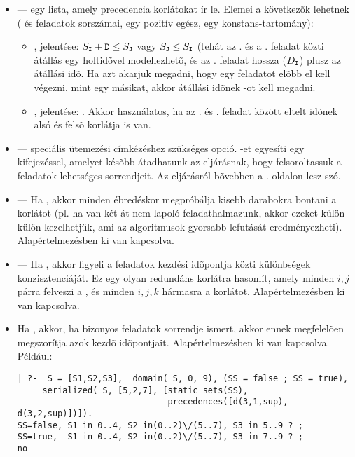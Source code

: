 \begin{itemize}
\item {} ---
           egy lista, amely precedencia korlátokat ír le. Elemei a következõk
          lehetnek ( és  feladatok sorszámai,  egy pozitív
          egész,  egy  konstans-tartomány):  
\begin{itemize}
\item{}, jelentése: $S_{\texttt{I}}+\texttt{D} \leq S_{\texttt{J}}$ vagy $S_{\texttt{J}} \leq S_{\texttt{I}}$
(tehát az . és a . feladat közti átállás egy holtidõvel modellezhetõ, és
 az . feladat hossza ($D_{\texttt{I}}$) plusz az átállási idõ. Ha azt akarjuk
megadni, hogy egy feladatot elõbb el kell végezni, mint egy másikat, akkor átállási
idõnek -ot kell megadni.
\item{}, jelentése: . Akkor használatos, ha az . és . feladat között
eltelt idõnek alsó és felsõ korlátja is van.
\end{itemize}

\item {} --- speciális ütemezési címkézéshez szükséges opció. -et
          egyesíti egy kifejezéssel, amelyet késõbb átadhatunk az 
          eljárásnak, hogy felsoroltassuk a feladatok lehetséges sorrendjeit. Az
           eljárásról bõvebben a \pageref{order_resource}. oldalon
          lesz szó.

\item {} ---
          Ha  , akkor minden ébredéskor megpróbálja
          kisebb darabokra bontani a korlátot (pl. ha van két
          át nem lapoló feladathalmazunk, akkor ezeket külön-külön
          kezelhetjük, ami az algoritmusok gyorsabb lefutását
          eredményezheti). Alapértelmezésben ki van kapcsolva.

\item {} ---
          Ha  , akkor figyeli a feladatok kezdési
          idõpontja közti különbségek konzisztenciáját. Ez egy olyan redundáns
          korlátra hasonlít, amely minden $i,j$ párra felveszi a
          , és minden $i,j,k$ hármasra a
           korlátot. Alapértelmezésben
          ki van kapcsolva.

\item {}
          Ha  , akkor, ha bizonyos feladatok sorrendje
          ismert, akkor ennek megfelelõen megszorítja azok kezdõ
          idõpontjait. Alapértelmezésben ki van kapcsolva. Például:
\begin{verbatim}
| ?- _S = [S1,S2,S3],  domain(_S, 0, 9), (SS = false ; SS = true),
     serialized(_S, [5,2,7], [static_sets(SS),
                              precedences([d(3,1,sup), d(3,2,sup)])]).
SS=false, S1 in 0..4, S2 in(0..2)\/(5..7), S3 in 5..9 ? ;
SS=true,  S1 in 0..4, S2 in(0..2)\/(5..7), S3 in 7..9 ? ;
no
\end{verbatim}


\end{itemize}

